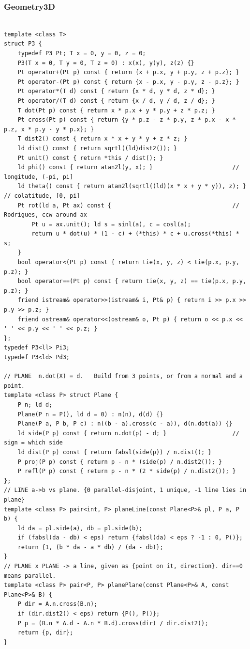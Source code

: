 \documentclass[9pt,a4paper,twocolumn]{extarticle}
\begin{document}
\subsubsection{Geometry3D}
\nopagebreak
\begin{lstlisting}

template <class T>
struct P3 {
    typedef P3 Pt; T x = 0, y = 0, z = 0;
    P3(T x = 0, T y = 0, T z = 0) : x(x), y(y), z(z) {}
    Pt operator+(Pt p) const { return {x + p.x, y + p.y, z + p.z}; }
    Pt operator-(Pt p) const { return {x - p.x, y - p.y, z - p.z}; }
    Pt operator*(T d) const { return {x * d, y * d, z * d}; }
    Pt operator/(T d) const { return {x / d, y / d, z / d}; }
    T dot(Pt p) const { return x * p.x + y * p.y + z * p.z; }
    Pt cross(Pt p) const { return {y * p.z - z * p.y, z * p.x - x * p.z, x * p.y - y * p.x}; }
    T dist2() const { return x * x + y * y + z * z; }
    ld dist() const { return sqrtl((ld)dist2()); }
    Pt unit() const { return *this / dist(); }
    ld phi() const { return atan2l(y, x); }                       // longitude, (-pi, pi]
    ld theta() const { return atan2l(sqrtl((ld)(x * x + y * y)), z); }  // colatitude, [0, pi]
    Pt rot(ld a, Pt ax) const {                                   // Rodrigues, ccw around ax
        Pt u = ax.unit(); ld s = sinl(a), c = cosl(a);
        return u * dot(u) * (1 - c) + (*this) * c + u.cross(*this) * s;
    }
    bool operator<(Pt p) const { return tie(x, y, z) < tie(p.x, p.y, p.z); }
    bool operator==(Pt p) const { return tie(x, y, z) == tie(p.x, p.y, p.z); }
    friend istream& operator>>(istream& i, Pt& p) { return i >> p.x >> p.y >> p.z; }
    friend ostream& operator<<(ostream& o, Pt p) { return o << p.x << ' ' << p.y << ' ' << p.z; }
};
typedef P3<ll> Pi3;
typedef P3<ld> Pd3;

// PLANE  n.dot(X) = d.   Build from 3 points, or from a normal and a point.
template <class P> struct Plane {
    P n; ld d;
    Plane(P n = P(), ld d = 0) : n(n), d(d) {}
    Plane(P a, P b, P c) : n((b - a).cross(c - a)), d(n.dot(a)) {}
    ld side(P p) const { return n.dot(p) - d; }                   // sign = which side
    ld dist(P p) const { return fabsl(side(p)) / n.dist(); }
    P proj(P p) const { return p - n * (side(p) / n.dist2()); }
    P refl(P p) const { return p - n * (2 * side(p) / n.dist2()); }
};
// LINE a->b vs plane. {0 parallel-disjoint, 1 unique, -1 line lies in plane}
template <class P> pair<int, P> planeLine(const Plane<P>& pl, P a, P b) {
    ld da = pl.side(a), db = pl.side(b);
    if (fabsl(da - db) < eps) return {fabsl(da) < eps ? -1 : 0, P()};
    return {1, (b * da - a * db) / (da - db)};
}
// PLANE x PLANE -> a line, given as {point on it, direction}. dir==0 means parallel.
template <class P> pair<P, P> planePlane(const Plane<P>& A, const Plane<P>& B) {
    P dir = A.n.cross(B.n);
    if (dir.dist2() < eps) return {P(), P()};
    P p = (B.n * A.d - A.n * B.d).cross(dir) / dir.dist2();
    return {p, dir};
}


\end{lstlisting}
\end{document}

